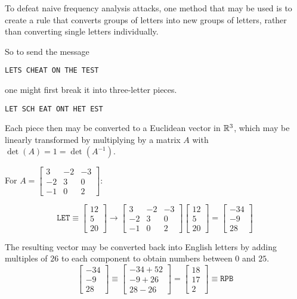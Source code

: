\begin{remark}
To defeat naive frequency analysis attacks, one method that may be
used is to create a rule that converts groups of letters into
new groups of letters, rather than converting single letters
individually.

\vspace{1em}

So to send the message 
\begin{center}\texttt{LETS CHEAT ON THE TEST}\end{center}
one might first break it into three-letter pieces.
\begin{center}\texttt{LET SCH EAT ONT HET EST}\end{center}
\end{remark}

\begin{remark}
Each piece then may be converted to a Euclidean vector in \(\mathbb{R}^3\),
which may be linearly transformed by multiplying by a matrix \(A\)
with \(\det(A)=1=\det(A^{-1})\).

\vspace{1em}

For \(A=\begin{bmatrix}3&-2&-3\\-2&3&0\\-1&0&2\end{bmatrix}\):

\[
\mathtt{LET}\equiv
\begin{bmatrix}12\\5\\20\end{bmatrix}\to
\begin{bmatrix}3&-2&-3\\-2&3&0\\-1&0&2\end{bmatrix}\begin{bmatrix}12\\5\\20\end{bmatrix}=
\begin{bmatrix}-34\\-9\\28\end{bmatrix}
\]
\end{remark}

\begin{remark}
The resulting vector may be converted back into English letters by
adding multiples of \(26\) to each component to obtain numbers between
\(0\) and \(25\).
\[
\begin{bmatrix}-34\\-9\\28\end{bmatrix}
\equiv
\begin{bmatrix}-34+52\\-9+26\\28-26\end{bmatrix}
=
\begin{bmatrix}18\\17\\2\end{bmatrix}
\equiv
\mathtt{RPB}
\]
\end{remark}

